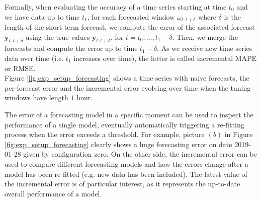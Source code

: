 \documentclass[a4paper, 12pt]{article} %
\begin{document}
	Formally, when evaluating the accuracy of a time series starting at time $t_0$ and we have data up to time $t_1$, for each forecasted window $\omega_{t:t+\delta}$ where $\delta$ is the length of the short term forecast, we compute the error of the associated forecast $\tilde{\pmb{y}}_{t:t+\delta}$ using the true values $\pmb{y}_{t:t+\delta}$, for $t=t_0, ..., t_1 - \delta$. Then, we merge the forecasts and compute the error up to time $t_1 - \delta$. As we receive new time series data over time (i.e. $t_1$ increases over time), the latter is called incremental MAPE or RMSE. \\
	Figure \ref{fig:exp_setup_forecasting} shows a time series with naive forecasts, the per-forecast error and the incremental error evolving over time when the tuning windows have length $1$ hour.
	
	The error of a forecasting model in a specific moment can be used to inspect the performance of a single model, eventually automatically triggering a re-fitting process when the error exceeds a threshold. For example, picture $(b)$ in Figure \ref{fig:exp_setup_forecasting} clearly shows a huge forecasting error on date 2019-01-28 given by configuration zero. On the other side, the incremental error can be used to compare different forecasting models and how the errors change after a model has been re-fitted (e.g. new data has been included). The latest value of the incremental error is of particular interest, as it represents the up-to-date overall performance of a model.
	
\end{document}
